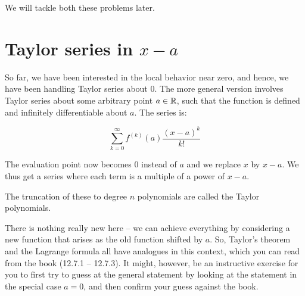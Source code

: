 \documentclass{amsart}
\begin{document}
We will tackle both these problems later.

\section{Taylor series in $x - a$}

So far, we have been interested in the local behavior near zero, and
hence, we have been handling Taylor series about $0$. The more general
version involves Taylor series about some arbitrary point $a \in \mathbb{R}$,
such that the function is defined and infinitely differentiable about
$a$. The series is:

$$\sum_{k=0}^\infty f^{(k)}(a)\frac{(x - a)^k}{k!}$$

The evaluation point now becomes $0$ instead of $a$ and we replace $x$
by $x - a$. We thus get a series where each term is a multiple of a
power of $x - a$.

The truncation of these to degree $n$ polynomials are called the
Taylor polynomials.

There is nothing really new here -- we can achieve everything by
considering a new function that arises as the old function shifted by
$a$. So, Taylor's theorem and the Lagrange formula all have analogues
in this context, which you can read from the book (12.7.1 --
12.7.3). It might, however, be an instructive exercise for you to
first try to guess at the general statement by looking at the
statement in the special case $a = 0$, and then confirm your guess
against the book.
\end{document}
